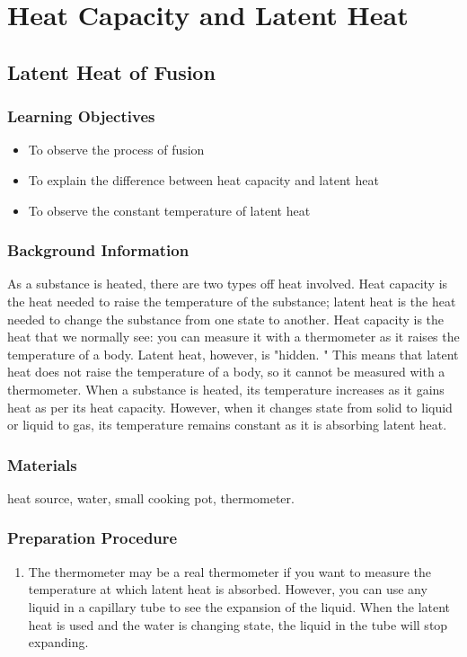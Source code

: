 \section{Heat Capacity and Latent Heat}

\subsection{Latent Heat of Fusion}

\subsubsection*{Learning Objectives}
\begin{itemize}
\item{To observe the process of fusion} 
\item{To explain the difference between heat capacity and latent heat} 
\item{To observe the constant temperature of latent heat} 
\end{itemize}

\subsubsection*{Background Information}
As a substance is heated, there are two types off heat involved. Heat capacity is the heat needed to raise the temperature of the substance; latent heat is the heat needed to change the substance from one state to another.  
Heat capacity is the heat that we normally see: you can measure it with a thermometer as it raises the temperature of a body. Latent heat, however, is "hidden.  " This means that latent heat does not raise the temperature of a body, so it cannot be measured with a thermometer.  
When a substance is heated, its temperature increases as it gains heat as per its heat capacity. However, when it changes state from solid to liquid or liquid to gas, its temperature remains constant as it is absorbing latent heat.  

\subsubsection*{Materials}
heat source, water, small cooking pot, thermometer.

\subsubsection*{Preparation Procedure}
\begin{enumerate}
\item{The thermometer may be a real thermometer if you want to measure the temperature at which latent heat is absorbed. However, you can use any liquid in a capillary tube to see the expansion of the liquid. When the latent heat is used and the water is changing state, the liquid in the tube will stop expanding.}
\end{enumerate}

